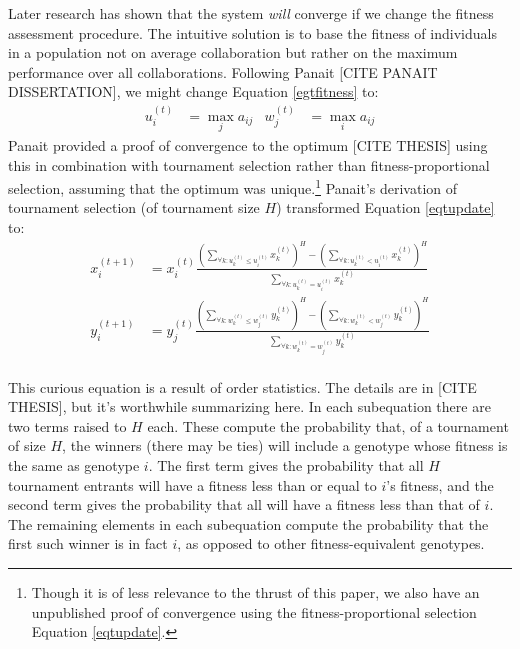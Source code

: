 \documentclass{acm_proc_article-sp}
\begin{document}
Later research has shown that the system {\it will} converge if we change the fitness assessment procedure.  The intuitive solution is to base the fitness of individuals in a population not on average collaboration but rather on the maximum performance over all collaborations.  Following Panait [CITE PANAIT DISSERTATION], we might change Equation \ref{egtfitness} to:
%
\begin{align}
\label{panaitfitness}
u_i^{(t)} & = \max_j a_{ij} &
w_j^{(t)} &= \max_i a_{ij}
\end{align}
%
Panait provided a proof of convergence to the optimum [CITE THESIS] using this in combination with tournament selection rather than fitness-proportional selection, assuming that the optimum was unique.\footnote{Though it is of less relevance to the thrust of this paper, we also have an unpublished proof of convergence using the fitness-proportional selection Equation \ref{eqtupdate}.}  Panait's derivation of tournament selection (of tournament size \(H\)) transformed Equation \ref{eqtupdate} to:
%
\begin{equation}
\label{tournamentselection}
\begin{split}
x_i^{(t+1)} &= x_i^{(t)} \frac{\left( \sum_{\forall k : u_k^{(t)} \leq u_i^{(t)}} x_k^{(t)} \right)^H -  
                                                 \left( \sum_{\forall k : u_k^{(t)} < u_i^{(t)}} x_k^{(t)} \right)^H}
                                                 {\sum_{\forall k : u_k^{(t)} = u_i^{(t)}} x_k^{(t)}} \\
y_i^{(t+1)} &= y_j^{(t)} \frac{\left( \sum_{\forall k : w_k^{(t)} \leq w_j^{(t)}} y_k^{(t)} \right)^H -  
                                                 \left( \sum_{\forall k : w_k^{(t)} < w_j^{(t)}} y_k^{(t)} \right)^H}
                                                 {\sum_{\forall k : w_k^{(t)} = w_j^{(t)}} y_k^{(t)}} \\
\end{split}
\end{equation}

This curious equation is a result of order statistics.  The details are in [CITE THESIS], but it's worthwhile summarizing here.  In each subequation there are two terms raised to \(H\) each.  These compute the probability that, of a tournament of size \(H\), the winners (there may be ties) will include a genotype whose fitness is the same as genotype \(i\).    The first term gives the probability that all \(H\) tournament entrants will have a fitness less than or equal to \(i\)'s fitness, and the second term gives the probability that all will have a fitness less than that of \(i\).  The remaining elements in each subequation compute the probability that the first such winner is in fact \(i\), as opposed to other fitness-equivalent genotypes.
\end{document}
